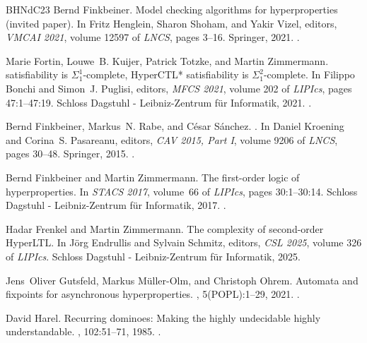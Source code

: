 \documentclass[dvipsnames,10pt,a4paper]{amsart}
\theoremstyle{definition}
\theoremstyle{remark}
\begin{document}
\begin{thebibliography}{BHNdC23}
Bernd Finkbeiner.
\newblock Model checking algorithms for hyperproperties (invited paper).
\newblock In Fritz Henglein, Sharon Shoham, and Yakir Vizel, editors, {\em {VMCAI} 2021}, volume 12597 of {\em LNCS}, pages 3--16. Springer, 2021.
\newblock \href {https://doi.org/10.1007/978-3-030-67067-2\_1} {}.

Marie Fortin, Louwe~B. Kuijer, Patrick Totzke, and Martin Zimmermann.
 satisfiability is {$\Sigma_1^1$}-complete, {HyperCTL*} satisfiability is {$\Sigma_1^2$}-complete.
\newblock In Filippo Bonchi and Simon~J. Puglisi, editors, {\em {MFCS} 2021}, volume 202 of {\em LIPIcs}, pages 47:1--47:19. Schloss Dagstuhl - Leibniz-Zentrum für Informatik, 2021.
\newblock \href {https://doi.org/10.4230/LIPIcs.MFCS.2021.47} {}.

Bernd Finkbeiner, Markus~N. Rabe, and C{\'{e}}sar S{\'{a}}nchez.
.
\newblock In Daniel Kroening and Corina~S. Pasareanu, editors, {\em {CAV} 2015, Part {I}}, volume 9206 of {\em LNCS}, pages 30--48. Springer, 2015.
\newblock \href {https://doi.org/10.1007/978-3-319-21690-4\_3} {}.

Bernd Finkbeiner and Martin Zimmermann.
\newblock The first-order logic of hyperproperties.
\newblock In {\em {STACS} 2017}, volume~66 of {\em LIPIcs}, pages 30:1--30:14. Schloss Dagstuhl - Leibniz-Zentrum für Informatik, 2017.
\newblock \href {https://doi.org/10.4230/LIPIcs.STACS.2017.30} {}.

Hadar Frenkel and Martin Zimmermann.
\newblock The complexity of second-order {HyperLTL}.
\newblock In J\"{o}rg Endrullis and Sylvain Schmitz, editors, {\em CSL 2025}, volume 326 of {\em LIPIcs}. Schloss Dagstuhl - Leibniz-Zentrum für Informatik, 2025.

Jens~Oliver Gutsfeld, Markus M{\"{u}}ller{-}Olm, and Christoph Ohrem.
\newblock Automata and fixpoints for asynchronous hyperproperties.
, 5({POPL}):1--29, 2021.
\newblock \href {https://doi.org/10.1145/3434319} {}.

David Harel.
\newblock Recurring dominoes: Making the highly undecidable highly understandable.
, 102:51--71, 1985.
\newblock \href {https://doi.org/10.1016/S0304-0208(08)73075-5} {}.


\end{thebibliography}
\end{document}
